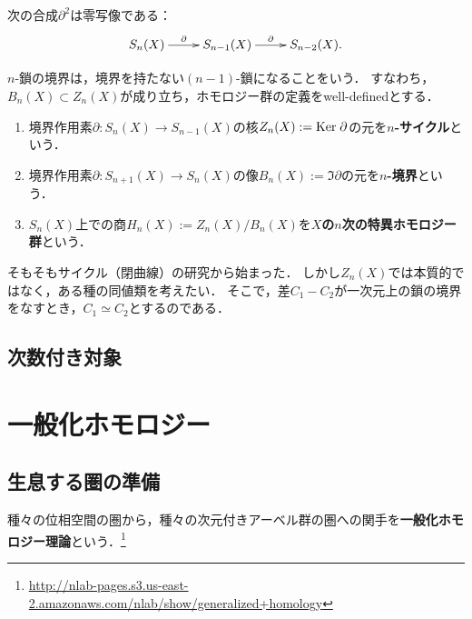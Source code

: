 \documentclass[uplatex,dvipdfmx]{jsreport}
\begin{document}
\begin{proposition}
    次の合成$\partial^2$は零写像である：
    \[\xymatrix@R-1pc{
        S_n(X)\ar[r]^-{\partial}&S_{n-1}(X)\ar[r]^-{\partial}&S_{n-2}(X).
    }\]
\end{proposition}
\begin{remarks}
    $n$-鎖の境界は，境界を持たない$(n-1)$-鎖になることをいう．
    すなわち，$B_n(X)\subset Z_n(X)$が成り立ち，ホモロジー群の定義をwell-definedとする．
\end{remarks}

\begin{definition}\mbox{}
    \begin{enumerate}
        \item 境界作用素$\partial:S_n(X)\to S_{n-1}(X)$の核$Z_n(X):=\mathrm{Ker}\;\partial$の元を\textbf{$n$-サイクル}という．
        \item 境界作用素$\partial:S_{n+1}(X)\to S_{n}(X)$の像$B_n(X):=\Im\partial$の元を\textbf{$n$-境界}という．
        \item $S_n(X)$上での商$H_n(X):=Z_n(X)/B_n(X)$を\textbf{$X$の$n$次の特異ホモロジー群}という．
    \end{enumerate}
\end{definition}
\begin{remarks}
    そもそもサイクル（閉曲線）の研究から始まった．
    しかし$Z_n(X)$では本質的ではなく，ある種の同値類を考えたい．
    そこで，差$C_1-C_2$が一次元上の鎖の境界をなすとき，$C_1\simeq C_2$とするのである．
\end{remarks}

\section{次数付き対象}

\chapter{一般化ホモロジー}

\section{生息する圏の準備}

\begin{tcolorbox}[colframe=ForestGreen, colback=ForestGreen!10!white,breakable,colbacktitle=ForestGreen!40!white,coltitle=black,fonttitle=\bfseries\sffamily,
title=]
    種々の位相空間の圏から，種々の次元付きアーベル群の圏への関手を\textbf{一般化ホモロジー理論}という．\footnote{\url{http://nlab-pages.s3.us-east-2.amazonaws.com/nlab/show/generalized+homology}}
\end{tcolorbox}
\end{document}
